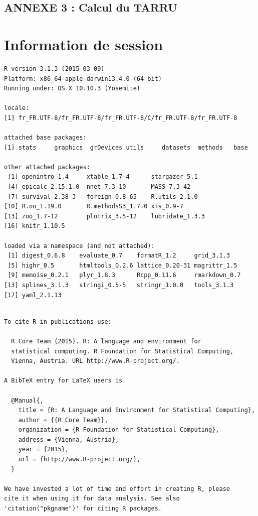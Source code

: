 \documentclass[]{article}
\begin{document}
\subsection{ANNEXE 3 : Calcul du TARRU}\label{annexe-3-calcul-du-tarru}

\section{Information de session}\label{information-de-session}

\begin{verbatim}
R version 3.1.3 (2015-03-09)
Platform: x86_64-apple-darwin13.4.0 (64-bit)
Running under: OS X 10.10.3 (Yosemite)

locale:
[1] fr_FR.UTF-8/fr_FR.UTF-8/fr_FR.UTF-8/C/fr_FR.UTF-8/fr_FR.UTF-8

attached base packages:
[1] stats     graphics  grDevices utils     datasets  methods   base     

other attached packages:
 [1] openintro_1.4     xtable_1.7-4      stargazer_5.1    
 [4] epicalc_2.15.1.0  nnet_7.3-10       MASS_7.3-42      
 [7] survival_2.38-3   foreign_0.8-65    R.utils_2.1.0    
[10] R.oo_1.19.0       R.methodsS3_1.7.0 xts_0.9-7        
[13] zoo_1.7-12        plotrix_3.5-12    lubridate_1.3.3  
[16] knitr_1.10.5     

loaded via a namespace (and not attached):
 [1] digest_0.6.8    evaluate_0.7    formatR_1.2     grid_3.1.3     
 [5] highr_0.5       htmltools_0.2.6 lattice_0.20-31 magrittr_1.5   
 [9] memoise_0.2.1   plyr_1.8.3      Rcpp_0.11.6     rmarkdown_0.7  
[13] splines_3.1.3   stringi_0.5-5   stringr_1.0.0   tools_3.1.3    
[17] yaml_2.1.13    
\end{verbatim}

\begin{verbatim}

To cite R in publications use:

  R Core Team (2015). R: A language and environment for
  statistical computing. R Foundation for Statistical Computing,
  Vienna, Austria. URL http://www.R-project.org/.

A BibTeX entry for LaTeX users is

  @Manual{,
    title = {R: A Language and Environment for Statistical Computing},
    author = {{R Core Team}},
    organization = {R Foundation for Statistical Computing},
    address = {Vienna, Austria},
    year = {2015},
    url = {http://www.R-project.org/},
  }

We have invested a lot of time and effort in creating R, please
cite it when using it for data analysis. See also
'citation("pkgname")' for citing R packages.
\end{verbatim}
\end{document}
